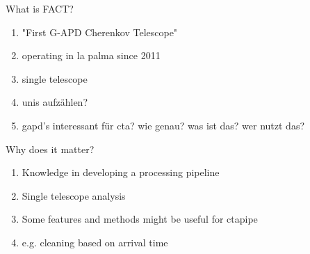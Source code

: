 \begin{frame}{What is FACT?}
    \begin{enumerate}
        \item "First G-APD Cherenkov Telescope"
        \item operating in la palma since 2011
        \item single telescope
        \item unis aufzählen?
        \item gapd's interessant für cta? wie genau? was ist das? wer nutzt das?
    \end{enumerate}
\end{frame}

\begin{frame}{Why does it matter?}
    \begin{enumerate}
        \item Knowledge in developing a processing pipeline 
        \item Single telescope analysis 
        \item Some features and methods might be useful for ctapipe
        \item e.g. cleaning based on arrival time
    \end{enumerate}
\end{frame}